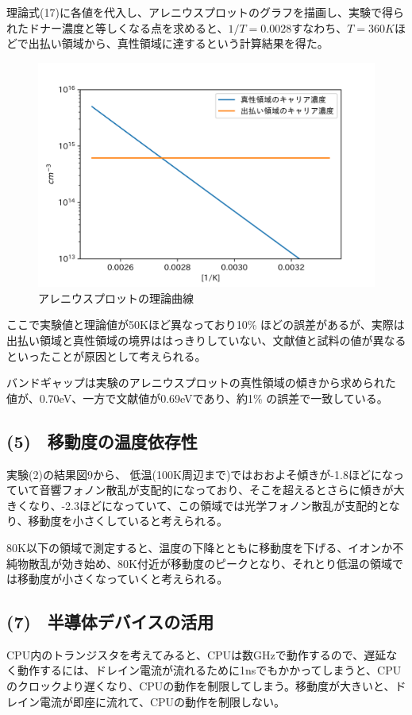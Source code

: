 \documentclass[dvipdfmx]{jsarticle}
\begin{document}
理論式(17)に各値を代入し、アレニウスプロットのグラフを描画し、実験で得られたドナー濃度と等しくなる点を求めると、$1/T = 0.0028$すなわち、$T = 360K$ほどで出払い領域から、真性領域に達するという計算結果を得た。

\begin{figure}[H]
\begin{center}
\includegraphics[scale = 1]{kousatu.png}
\caption{アレニウスプロットの理論曲線}
\end{center}
\end{figure}

ここで実験値と理論値が50Kほど異なっており10\% ほどの誤差があるが、実際は出払い領域と真性領域の境界ははっきりしていない、文献値と試料の値が異なるといったことが原因として考えられる。

バンドギャップは実験のアレニウスプロットの真性領域の傾きから求められた値が、0.70eV、一方で文献値が0.69eVであり、約1\% の誤差で一致している。
\subsection*{(5)　移動度の温度依存性}
実験(2)の結果図9から、
低温(100K周辺まで)ではおおよそ傾きが-1.8ほどになっていて音響フォノン散乱が支配的になっており、そこを超えるとさらに傾きが大きくなり、-2.3ほどになっていて、この領域では光学フォノン散乱が支配的となり、移動度を小さくしていると考えられる。

80K以下の領域で測定すると、温度の下降とともに移動度を下げる、イオンか不純物散乱が効き始め、80K付近が移動度のピークとなり、それとり低温の領域では移動度が小さくなっていくと考えられる。

\subsection*{(7)　半導体デバイスの活用}
CPU内のトランジスタを考えてみると、CPUは数GHzで動作するので、遅延なく動作するには、ドレイン電流が流れるために1nsでもかかってしまうと、CPUのクロックより遅くなり、CPUの動作を制限してしまう。移動度が大きいと、ドレイン電流が即座に流れて、CPUの動作を制限しない。
\end{document}
